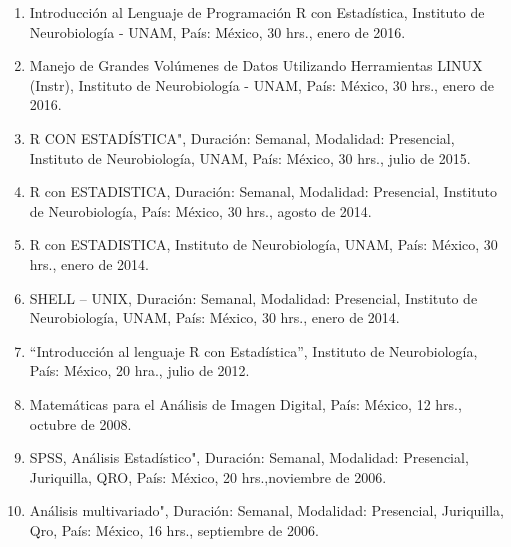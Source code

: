 \begin{enumerate}
\item Introducción al Lenguaje de Programación R con Estadística, Instituto de Neurobiología - UNAM, País: México, 30 hrs.,  enero de 2016.

\item Manejo de Grandes Volúmenes de Datos Utilizando Herramientas LINUX (Instr), Instituto de Neurobiología - UNAM, País: México, 30 hrs., enero de 2016.

\item R CON ESTADÍSTICA", Duración: Semanal, Modalidad: Presencial, Instituto de Neurobiología, UNAM, País: México, 30 hrs., julio de 2015.

\item R con ESTADISTICA, Duración: Semanal, Modalidad: Presencial, Instituto de 
Neurobiología, País: México, 30 hrs., agosto de 2014.

\item R con ESTADISTICA, Instituto de 
Neurobiología, UNAM, País: México, 30 hrs., enero de 2014.

\item SHELL – UNIX, Duración: Semanal, Modalidad: Presencial, Instituto de 
Neurobiología, UNAM, País: México, 30 hrs., enero de 2014.

\item “Introducción al lenguaje R con Estadística”, Instituto de Neurobiología, País: México, 20 hra., julio de 2012.

\item Matemáticas para el Análisis de Imagen Digital, País: México, 12 hrs., octubre de 2008.

\item SPSS, Análisis Estadístico", Duración: Semanal, Modalidad: Presencial, Juriquilla, QRO, País: México, 20 hrs.,noviembre de 2006.

\item Análisis multivariado", Duración: Semanal, Modalidad: Presencial, Juriquilla, 
Qro, País: México, 16 hrs., septiembre de 2006.

\end{enumerate}

